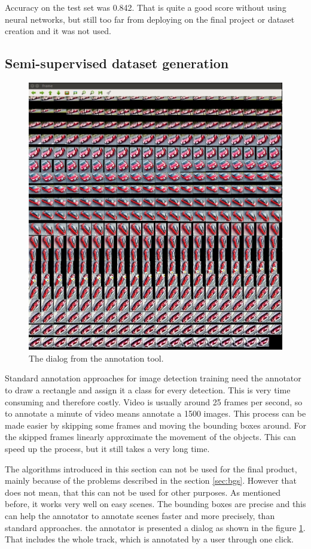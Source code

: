 \documentclass[a4paper,12pt,titlepage, twoside]{article}
\numberwithin{figure}{section}
\begin{document}
Accuracy on the test set was 0.842. That is quite a good score without using neural networks, but still too far from deploying on the final project or dataset creation and it was not used.

\subsection{Semi-supervised dataset generation} 
\label{sec:data-generation}

\begin{figure}[h!]
\centering
\includegraphics[width=0.5\linewidth]{fig/omni_labeling.png}
\caption{The dialog from the annotation tool.}
\label{fig:labeling}
\end{figure}

Standard annotation approaches for image detection training need the annotator to draw a rectangle and assign it a class for every detection. This is very time consuming and therefore costly. Video is usually around 25 frames per second, so to annotate a minute of video means annotate a 1500 images. This process can be made easier by skipping some frames and moving the bounding boxes around. For the skipped frames linearly approximate the movement of the objects. This can speed up the process, but it still takes a very long time. 


The algorithms introduced in this section can not be used for the final product, mainly because of the problems described in the section \ref{sec:bgs}. However that does not mean, that this can not be used for other purposes. As mentioned before, it works very well on easy scenes. The bounding boxes are precise and this can help the annotator to annotate scenes faster and more precisely, than standard approaches. the annotator is presented a dialog as shown in the figure \ref{fig:labeling}. That includes the whole track, which is annotated by a user through one click. 
\end{document}
